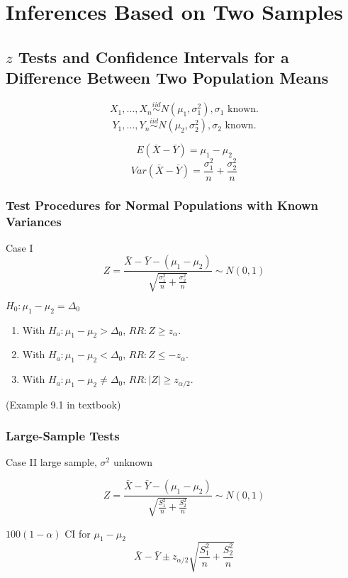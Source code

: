 \chapter{Inferences Based on Two Samples}
\section{$z$ Tests and Confidence Intervals for a Difference Between Two Population Means}

\[X_1,\dots,X_n \overset{iid}{\sim} N(\mu_1,\sigma_1^2), \sigma_1 \text{ known}.\]
\[Y_1,\dots,Y_n \overset{iid}{\sim} N(\mu_2,\sigma_2^2), \sigma_2 \text{ known}.\]

\begin{prop}
\[E(\bar{X}-\bar{Y})=\mu_1-\mu_2\]
\[Var(\bar{X}-\bar{Y})=\frac{\sigma_1^2}{n}+\frac{\sigma_2^2}{n}\]
\end{prop}

\subsection{Test Procedures for Normal Populations with Known Variances}
Case I
\[Z=\frac{\bar{X}-\bar{Y}-(\mu_1-\mu_2)}{\sqrt{\frac{\sigma_1^2}{n}+\frac{\sigma_2^2}{n}}} \sim N(0,1)\]

$H_0:\mu_1-\mu_2=\Delta_0$
\begin{enumerate}
\item With $H_a: \mu_1-\mu_2>\Delta_0$, $RR:Z\geq z_{\alpha}$.
\item With $H_a: \mu_1-\mu_2<\Delta_0$, $RR:Z\leq -z_{\alpha}$.
\item With $H_a: \mu_1-\mu_2\neq\Delta_0$, $RR:|Z|\geq z_{\alpha/2}$.
\end{enumerate}

\begin{exmp}
(Example 9.1 in textbook)
\end{exmp}

\subsection{Large-Sample Tests}
Case II large sample, $\sigma^2$ unknown

\[Z=\frac{\bar{X}-\bar{Y}-(\mu_1-\mu_2)}{\sqrt{\frac{S_1^2}{n}+\frac{S_2^2}{n}}} \sim N(0,1)\]

$100(1-\alpha)$ CI for $\mu_1-\mu_2$
\[ \bar{X}-\bar{Y} \pm z_{\alpha/2} \sqrt{\frac{S_1^2}{n}+\frac{S_2^2}{n}} \]

